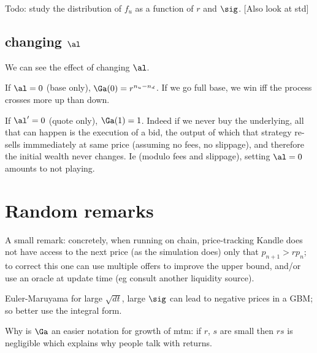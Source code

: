 \documentclass[oneside,twocolumn,12pt]{article}
\begin{document}
Todo: study the distribution of $f_u$ as a function of $r$ and $\sig$. [Also look at std]

\subsection{changing $\al$}
We can see the effect of changing $\al$.

If $\al=0$ (base only), $\Ga(0) = r^{n_u-n_d}$. If we go full base,
we win iff the process crosses more up than down.

If $\al'=0$ (quote only), $\Ga(1) = 1$. Indeed if we never buy the underlying,
all that can happen is the execution of a bid, 
the output of which that strategy re-sells immmediately at same price (assuming no fees, no slippage),
and therefore the initial wealth never changes. Ie (modulo fees and slippage), setting $\al=0$ amounts to not playing.


\section{Random remarks}

A small remark: concretely, when running on chain, price-tracking Kandle does not have access to the next price (as the simulation does)
only that $p_{n+1}>r p_n$;
to correct this one can use multiple offers to improve the upper bound,
and/or use an oracle at update time (eg consult another liquidity source).

Euler-Maruyama for large $\sqrt{dt}$, large $\sig$ can lead to negative prices in a GBM;
so better use the integral form. 


Why is $\Ga$ an easier notation for growth of mtm:
if $r$, $s$ are small then $rs$ is negligible which explains why people talk with returns.



\end{document}

